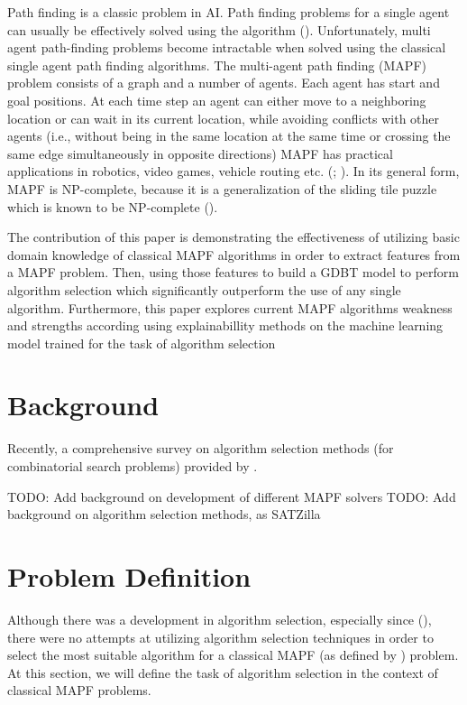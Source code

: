 \documentclass[letterpaper]{article} %
\begin{document}
Path finding is a classic problem in AI. Path finding problems for a single agent can usually be effectively solved using the \astar  algorithm (\cite{appi1966formal}). Unfortunately, multi agent path-finding problems become intractable when solved using the classical single agent path finding algorithms. The multi-agent path finding (MAPF) problem consists of a graph and a number of agents. Each agent has start and goal positions. At each time step an agent can either move to a neighboring location or can wait in its current location, while avoiding conflicts with other agents (i.e., without being in the same location at the same time or crossing the same edge simultaneously in opposite directions) 
MAPF has practical applications in robotics, video games, vehicle routing etc. (\cite{silver2005cooperative}; \cite{dresner2008multiagent}). In its general form, MAPF is NP-complete, because it is a generalization of the sliding tile puzzle which is known to be NP-complete (\cite{ratner1986finding}).

The contribution of this paper is demonstrating the effectiveness of utilizing basic domain knowledge of classical MAPF algorithms in order to extract features from a MAPF problem. Then, using those features to build a GDBT model to perform algorithm selection which significantly outperform the use of any single algorithm. Furthermore, this paper explores current MAPF algorithms weakness and strengths according using explainabillity methods on the machine learning model trained for the task of algorithm selection 

\section{Background}








Recently, a comprehensive survey on algorithm selection methods (for combinatorial search problems) provided by \cite{hutteralgorithm} . 

TODO: Add background on development of different MAPF solvers
TODO: Add background on algorithm selection methods, as SATZilla 

\section{Problem Definition}
Although there was a development in algorithm selection, especially since (\cite{xu2008satzilla}), there were no attempts at utilizing algorithm selection techniques in order to select the most suitable algorithm for a classical MAPF (as defined by \cite{stern2019multiagent}) problem. At this section, we will define the task of algorithm selection in the context of classical MAPF problems.
\end{document}
